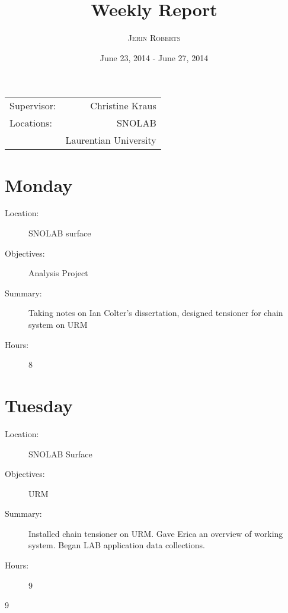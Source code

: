 \documentclass{article}
\title{\huge{Weekly Report}} %
\author{ \textsc{Jerin Roberts}} %
\date{June 23, 2014 - June 27, 2014} %
\begin{document}
\maketitle %

\begin{center}
\begin{tabular}{l r}


Supervisor: & Christine Kraus \\ %
Locations: & SNOLAB \\ %
& Laurentian University\\


\end{tabular}
\end{center}



\section{Monday}
\begin{description}
\item[Location:] SNOLAB surface
\item[Objectives:]Analysis Project
\item[Summary:] Taking notes on Ian Colter’s dissertation, designed tensioner for chain system on URM
\item[Hours:] 8

\end{description} 

\section{Tuesday}

\begin{description}
\item[Location:]SNOLAB Surface
\item[Objectives:] URM
\item[Summary:] Installed chain tensioner on URM. Gave Erica an overview of working system. Began LAB application data collections.
\item[Hours:]  9

\end{description}9
\end{document}
